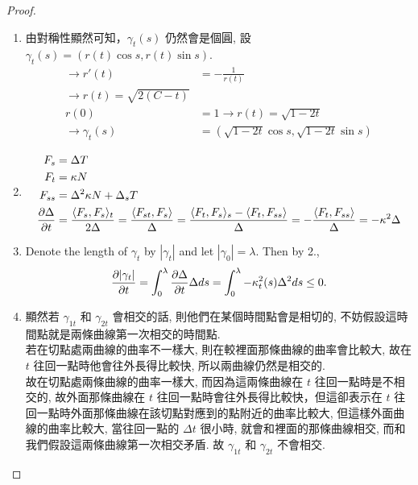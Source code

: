\documentclass[10pt,a4paper]{article}
\begin{document}
\begin{proof}
\begin{enumerate}
\item 
由對稱性顯然可知，$\gamma_t(s)$ 仍然會是個圓, 設 $\gamma_t(s)=(r(t)\cos s, r(t)\sin s)$.\\
\begin{align*}
\rightarrow r'(t)&=-\frac{1}{r(t)}\\
\rightarrow r(t)=\sqrt{2(C-t)}\\
r(0)&=1 \rightarrow r(t)=\sqrt{1-2t}\\
\rightarrow \gamma_t(s)&=(\sqrt{1-2t}\cos s, \sqrt{1-2t}\sin s)
\end{align*}
\item 
\begin{align*}
F_s &= \Delta T \\
F_t &= \kappa N \\
F_{ss} &= \Delta^2\kappa N + \Delta_sT\\
\frac{\partial \Delta}{\partial t}&=\frac{\langle F_s, F_s\rangle_t}{2\Delta}=\frac{\langle F_{st}, F_s\rangle}{\Delta}=\frac{\langle F_t, F_s\rangle_s-\langle F_{t}, F_{ss}\rangle}{\Delta}=-\frac{\langle F_t, F_{ss}\rangle}{\Delta}=-\kappa^2\Delta
\end{align*}
\item Denote the length of $\gamma_t$ by $|\gamma_t|$ and let $|\gamma_0|=\lambda$. Then by 2., $$\frac{\partial |\gamma_t|}{\partial t} =\int_0^{\lambda}\frac{\partial \Delta}{\partial t}\Delta ds = \int_0^{\lambda}-\kappa_t^2(s)\Delta^2 ds \leq 0.$$
\item
顯然若 $\gamma_{1t}$ 和 $\gamma_{2t}$ 會相交的話, 則他們在某個時間點會是相切的, 不妨假設這時間點就是兩條曲線第一次相交的時間點.\\
若在切點處兩曲線的曲率不一樣大, 則在較裡面那條曲線的曲率會比較大, 故在 $t$ 往回一點時他會往外長得比較快, 所以兩曲線仍然是相交的.\\
故在切點處兩條曲線的曲率一樣大, 而因為這兩條曲線在 $t$ 往回一點時是不相交的, 故外面那條曲線在 $t$ 往回一點時會往外長得比較快，但這卻表示在 $t$ 往回一點時外面那條曲線在該切點對應到的點附近的曲率比較大, 但這樣外面曲線的曲率比較大, 當往回一點的 $\Delta t$ 很小時, 就會和裡面的那條曲線相交, 而和我們假設這兩條曲線第一次相交矛盾. 故 $\gamma_{1t}$ 和 $\gamma_{2t}$ 不會相交.
\end{enumerate}
\end{proof}
\end{document}

